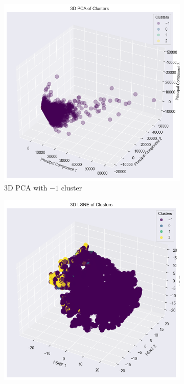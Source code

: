 \begin{figure}[H]
    \hspace*{\fill}
    \centering
    \begin{subfigure}[b]{0.45\textwidth}
        \centering
        \includegraphics[width=1.0\textwidth]{src/figs/3d_PCA_DBSCAN_with.png} 
        \caption{3D PCA with $-1$ cluster}\label{fig:DBSCAN_PCA_with}
    \end{subfigure}
    \hfill
    \begin{subfigure}[b]{0.45\textwidth}
        \centering
        \includegraphics[width=1.0\textwidth]{src/figs/3d_t-SNE_DBSCAN_with.png} 

\end{subfigure}
\end{figure}
